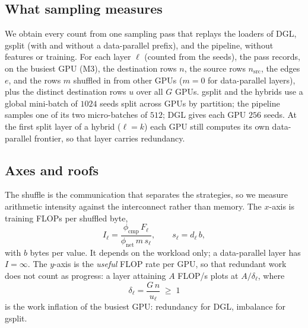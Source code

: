 \subsection{What sampling measures}
\label{sec:cm-sampling}

We obtain every count from one sampling pass that replays the loaders of DGL, gsplit (with and
without a data-parallel prefix), and the pipeline, without features or training. For each layer
$\ell$ (counted from the seeds), the pass records, on the busiest GPU (M3), the destination rows $n$, the source rows $n_{\mathrm{src}}$,
the edges $e$, and the rows $m$ shuffled in from other GPUs ($m = 0$ for data-parallel layers), plus the distinct
destination rows $u$ over all $G$ GPUs. gsplit and the hybrids use a global mini-batch of $1024$
seeds split across GPUs by partition; the pipeline samples one of its two micro-batches of $512$;
DGL gives each GPU $256$ seeds. At the first split layer of a hybrid ($\ell = k$) each GPU still
computes its own data-parallel frontier, so that layer carries redundancy.

\subsection{Axes and roofs}
\label{sec:cm-axes}
\label{sec:cm-roofs}

The shuffle is the communication that separates the strategies, so we measure arithmetic
intensity against the interconnect rather than memory. The $x$-axis is training FLOPs per
shuffled byte,
\begin{equation}
  I_\ell = \frac{\phi_{\mathrm{cmp}}\, F_\ell}{\phi_{\mathrm{net}}\, m\, s_\ell},
  \qquad s_\ell = d_\ell\, b,
  \label{eq:cm-x}
\end{equation}
with $b$ bytes per value. It depends on the workload only; a data-parallel layer has
$I = \infty$. The $y$-axis is the \emph{useful} FLOP rate per GPU, so that redundant work does not
count as progress: a layer attaining $A$ FLOP/s plots at $A/\delta_\ell$, where
\begin{equation}
  \delta_\ell = \frac{G\, n}{u_\ell} \;\ge\; 1
  \label{eq:cm-redundancy}
\end{equation}
is the work inflation of the busiest GPU: redundancy for DGL, imbalance for gsplit.

